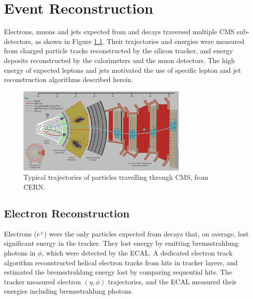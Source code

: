 \chapter{Event Reconstruction}
\label{sec:reco_chapter}

Electrons, muons and jets expected from \WR and \nul decays traversed multiple CMS sub-detectors, 
as shown in Figure \ref{fig:particleTrajectories}.  Their trajectories and energies were measured 
from charged particle tracks reconstructed by the silicon tracker, and energy deposits reconstructed 
by the calorimeters and the muon detectors.  The high energy of expected leptons and jets motivated 
the use of specific lepton and jet reconstruction algorithms described herein.

\begin{figure}[h]
	\centering
	\includegraphics[width=0.75\textwidth]{figures/flowOfParticlesThroughCMS.png}
	\caption{Typical trajectories of particles travelling through CMS, from CERN.}
	\label{fig:particleTrajectories}
\end{figure}


\section{Electron Reconstruction}
\label{sec:eleReco}
Electrons ($e^{\pm}$) were the only particles expected from \WR decays that, on average, lost significant 
energy in the tracker.  They lost energy by emitting bremsstrahlung photons in $\phi$, which were detected 
by the ECAL.  A dedicated electron track algorithm reconstructed helical electron tracks from hits in tracker 
layers, and estimated the bremsstrahlung energy lost by comparing sequential hits.  The tracker measured 
electron $(\eta, \phi)$ trajectories, and the ECAL measured their energies including bremsstrahlung photons.

